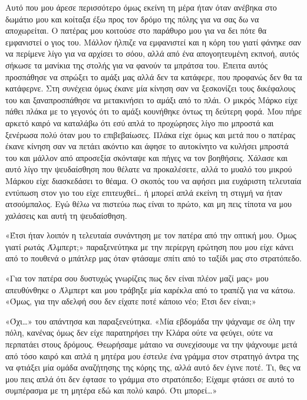 \documentclass[12pt,twoside, openany]{book}
\begin{document}
Αυτό που μου άρεσε περισσότερο όμως εκείνη τη μέρα ήταν όταν ανέβηκα στο δωμάτιο μου και κοίταξα έξω προς τον δρόμο της πόλης για να σας δω να αποχωρείται. Ο πατέρας μου κοιτούσε στο παράθυρο μου για να δει πότε θα εμφανιστεί ο γιος του. Μάλλον ήλπιζε να εμφανιστεί και η κόρη του γιατί φάνηκε σαν να περίμενε λίγο για να αρχίσει το σόου, αλλά από ένα απογοητευμένη εκπνοή, αυτός σήκωσε τα μανίκια της στολής για να φανούν τα μπράτσα του. Έπειτα αυτός προσπάθησε να σπρώξει το αμάξι μας αλλά δεν τα κατάφερε, που προφανώς δεν θα τα κατάφερνε. Στη συνέχεια όμως έκανε μία κίνηση σαν να ξεσκονίζει τους δικέφαλους του και ξαναπροσπάθησε να μετακινήσει το αμάξι από το πλάι. Ο μικρός Μάρκο είχε πάθει πλάκα με το γεγονός ότι το αμάξι κουνήθηκε όντως τη δεύτερη φορά. Μου πήρε αρκετό καιρό να καταλάβω ότι εσύ απλά το προχώρησες λίγο πιο μπροστά και ξενέρωσα πολύ όταν μου το επιβεβαίωσες. Πλάκα είχε όμως και μετά που ο πατέρας έκανε κίνηση σαν να πετάει ακόντιο και άφησε το αυτοκίνητο να κυλήσει μπροστά του και μάλλον από απροσεξία σκόνταψε και πήγες να τον βοηθήσεις. Χάλασε και αυτό λίγο την ψευδαίσθηση που θέλατε να προκαλέσετε, αλλά το μυαλό του μικρού Μάρκου είχε διασκεδάσει το θέαμα. Ο σκοπός του να αφήσει μια ευχάριστη τελευταία εντύπωση στον γιο του είχε επιτευχθεί… ή μπορεί απλά εκείνη τη στιγμή να ήταν ατσούμπαλος. Εγώ θέλω να πιστεύω πως είναι το πρώτο, και μη πεις τίποτα να μου χαλάσεις και αυτή τη ψευδαίσθηση.\newline\newline

«Έτσι ήταν λοιπόν η τελευταία συνάντηση με τον πατέρα από την οπτική μου. Όμως γιατί ρωτάς Άλμπερτ;» παραξενεύτηκα με την περίεργη ερώτηση που μου είχε κάνει από το πουθενά ο μπάτλερ μας όταν φτάσαμε σπίτι από το ταξίδι μας στο στρατόπεδο.

«Για τον πατέρα σου δυστυχώς γνωρίζεις πως δεν είναι πλέον μαζί μας» μου απευθύνθηκε ο Άλμπερτ και μου τράβηξε μία καρέκλα από το τραπέζι για να κάτσω. «Όμως, για την αδελφή σου δεν είχατε ποτέ κάποιο νέο; Έτσι δεν είναι;»

«Όχι…» του απάντησα και παραξενεύτηκα. «Μία εβδομάδα την ψάχναμε σε όλη την πόλη, κανένας όμως δεν είχε παρατηρήσει την Κλάρα ούτε να φεύγει, ούτε να περπατάει στους δρόμους. Θεωρήσαμε μάταιο να συνεχίσουμε να την ψάχνουμε μετά από τόσο καιρό και απλά η μητέρα μου έστειλε ένα γράμμα στον στρατηγό άντρα της να φτιάξει μία ομάδα αναζήτησης της κόρης της, αλλά αυτό δεν έγινε ποτέ. Τι, θες να μου πεις απλά ότι δεν έφτασε το γράμμα στο στρατόπεδο; Είχαμε φτάσει σε αυτό το συμπέρασμα με τη μητέρα εδώ και πολύ καιρό. Ότι μπορεί…»
\end{document}
